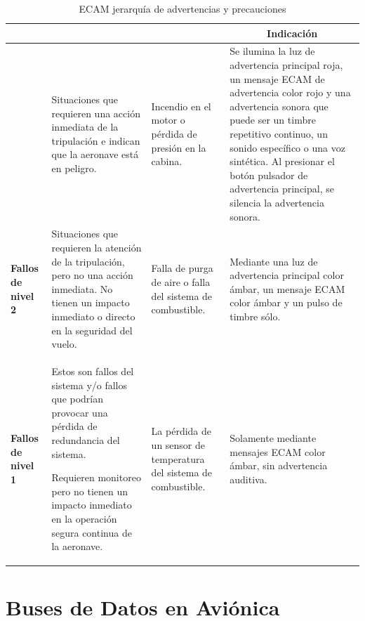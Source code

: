 \begin{table}[!h]
 \centering
 \caption{ECAM jerarqu\'ia de advertencias y precauciones}
 \label{tab:01.ecam.jerarquia.de.advertencias.y.precauciones}

  \begin{tabular}{m{}m{}m{}m{}} \hline \rowcolor{cyan!20}
\centering {\bf Jerarqu\'ia} & \centering {\bf Descripci\'on} & \centering {\bf Ejemplo} & \multicolumn{1}{c}{\bf Indicaci\'on} \\ \hline 

 \cellcolor{red!80} \centering \textcolor{white}{\bf Fallas de nivel 3} 
&
\begin{spacing}{0.75}
  {\scriptsize Situaciones que requieren una acción inmediata de la tripulación e indican que la aeronave está en peligro. }
\end{spacing}
& {\scriptsize Incendio en el motor o pérdida de presión en la cabina. }

& {\scriptsize Se ilumina la luz de advertencia principal roja, un mensaje ECAM de advertencia color rojo y una advertencia sonora que puede ser un timbre repetitivo continuo, un sonido específico o una voz sintética. Al presionar el botón pulsador de advertencia principal, se silencia la advertencia sonora.} \\ \hline \cellcolor{amber}

  \centering \textbf{Fallos de nivel 2} & {\scriptsize Situaciones que requieren la atención de la tripulación, pero no una acción inmediata. No tienen un impacto inmediato o directo en la seguridad del vuelo. } 

& {\scriptsize Falla de purga de aire o falla del sistema de combustible. }

&{\scriptsize Mediante una luz de advertencia principal color ámbar, un mensaje ECAM color ámbar y un pulso de timbre s\'olo.} \\ \hline \cellcolor{amber}

   \centering \textbf{Fallos de nivel 1} & {\scriptsize Estos son fallos del sistema y/o fallos que podrían provocar una pérdida de redundancia del sistema.

 Requieren monitoreo pero no tienen un impacto inmediato en la operación segura continua de la aeronave. }

&{\scriptsize La pérdida de un sensor de temperatura del sistema de combustible. }

&{\scriptsize Solamente mediante mensajes ECAM color ámbar, sin advertencia auditiva.} \\ \hline
    
  \end{tabular}
\end{table}


\section{Buses de Datos en Avi\'onica}
\label{sec:U01.05.buses.datos.avionica}

